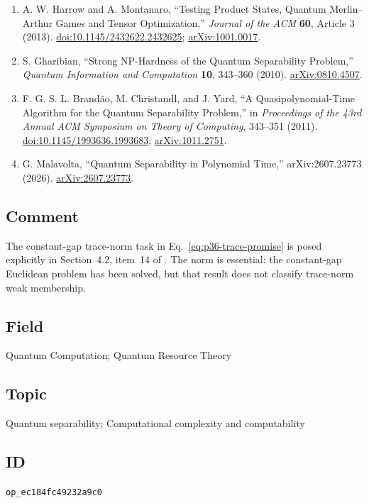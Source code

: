 \begin{enumerate}[label={},leftmargin=4.8em,labelsep=0.5em]
  \footnotesize
  \item[\textup{[HM13]}]\label{ref:p36-harrow}
  A. W. Harrow and A. Montanaro, ``Testing Product States, Quantum
  Merlin--Arthur Games and Tensor Optimization,''
  \emph{Journal of the ACM} \textbf{60}, Article 3 (2013).
  \href{https://doi.org/10.1145/2432622.2432625}{doi:10.1145/2432622.2432625};
  \href{https://arxiv.org/abs/1001.0017}{arXiv:1001.0017}.

  \item[\textup{[Gha10]}]\label{ref:p36-gharibian}
  S. Gharibian, ``Strong NP-Hardness of the Quantum Separability Problem,''
  \emph{Quantum Information and Computation} \textbf{10}, 343--360 (2010).
  \href{https://arxiv.org/abs/0810.4507}{arXiv:0810.4507}.

  \item[\textup{[BCY11]}]\label{ref:p36-brandao}
  F. G. S. L. Brand\~ao, M. Christandl, and J. Yard,
  ``A Quasipolynomial-Time Algorithm for the Quantum Separability Problem,''
  in \emph{Proceedings of the 43rd Annual ACM Symposium on Theory of
  Computing}, 343--351 (2011).
  \href{https://doi.org/10.1145/1993636.1993683}{doi:10.1145/1993636.1993683};
  \href{https://arxiv.org/abs/1011.2751}{arXiv:1011.2751}.

  \item[\textup{[Mal26]}]\label{ref:p36-malavolta}
  G. Malavolta, ``Quantum Separability in Polynomial Time,''
  arXiv:2607.23773 (2026).
  \href{https://arxiv.org/abs/2607.23773}{arXiv:2607.23773}.
\end{enumerate}

\subsection*{Comment}

The constant-gap trace-norm task in
Eq.~\eqref{eq:p36-trace-promise} is posed explicitly in Section~4.2,
item~14 of .  The norm is essential: the
constant-gap Euclidean problem has been solved, but that result does not
classify trace-norm weak membership.

\subsection*{Field}

Quantum Computation; Quantum Resource Theory

\subsection*{Topic}

Quantum separability; Computational complexity and computability

\subsection*{ID}

\texttt{op\_ec184fc49232a9c0}
